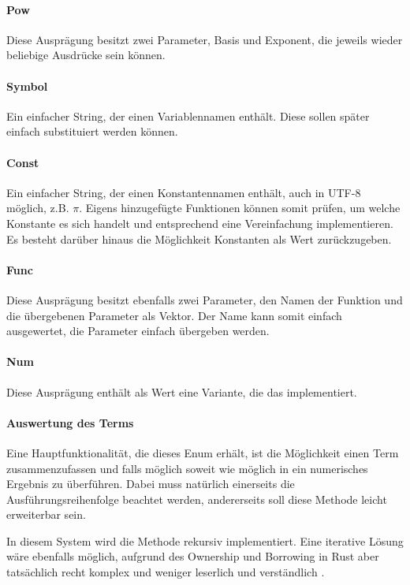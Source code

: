 \documentclass[11pt,a4paper, ngerman]{article}
\begin{document}
\paragraph{Pow} Diese Ausprägung besitzt zwei Parameter, Basis und Exponent, die jeweils wieder beliebige Ausdrücke sein können.

\paragraph{Symbol} Ein einfacher String, der einen Variablennamen enthält. Diese sollen später einfach substituiert werden können.

\paragraph{Const} Ein einfacher String, der einen Konstantennamen enthält, auch in UTF-8 möglich, z.B. $\pi$. Eigens hinzugefügte Funktionen können somit prüfen, um welche Konstante es sich handelt und entsprechend eine Vereinfachung implementieren. Es besteht darüber hinaus die Möglichkeit Konstanten als Wert zurückzugeben.

\paragraph{Func} Diese Ausprägung besitzt ebenfalls zwei Parameter, den Namen der Funktion und die übergebenen Parameter als Vektor. Der Name kann somit einfach ausgewertet, die Parameter einfach übergeben werden.

\paragraph{Num} Diese Ausprägung enthält als Wert eine Variante, die das   implementiert.

\paragraph{Auswertung des Terms} Eine Hauptfunktionalität, die dieses Enum erhält, ist die Möglichkeit einen Term zusammenzufassen und falls möglich soweit wie möglich in ein numerisches Ergebnis zu überführen. Dabei muss natürlich einerseits die Ausführungsreihenfolge beachtet werden, andererseits soll diese Methode leicht erweiterbar sein.

In diesem System wird die Methode rekursiv implementiert. Eine iterative Lösung wäre ebenfalls möglich, aufgrund des Ownership und Borrowing in Rust aber tatsächlich recht komplex und weniger leserlich und verständlich \cite{RustRecToItAst}.
\end{document}
